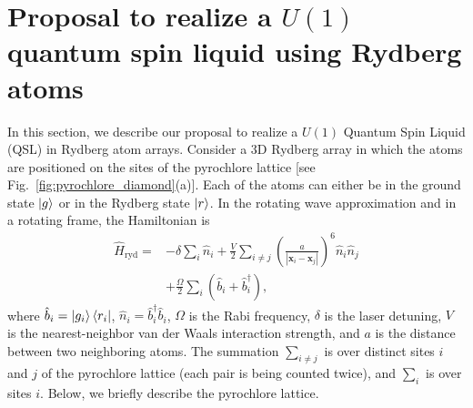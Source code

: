 \documentclass[twocolumn,superscriptaddress,amsmath,amssymb,aps,prx,nofootinbib]{revtex4-2}
\begin{document}
\section{Proposal to realize a $U(1)$ quantum spin liquid using Rydberg atoms}\label{sec:proposal}



In this section, we describe our proposal to realize a $U(1)$ Quantum Spin Liquid (QSL) in Rydberg atom arrays. 
Consider a 3D Rydberg array in which the atoms are positioned on the sites of the pyrochlore lattice [see Fig.~\ref{fig:pyrochlore_diamond}(a)]. Each of the atoms can either be  in the ground state $\ket{g}$ or in the  Rydberg state $\ket{r}$. In the rotating wave approximation and in a rotating frame, the Hamiltonian is
\begin{equation}
\begin{aligned}
  \hat{H}_{\text{ryd}} =& -\delta \sum_i \hat{n}_i + \frac{V}{2} \sum_{i \neq j} \left( \frac{a}{|\bm{x}_i -\bm{x}_j|} \right)^6 \hat{n}_i \hat{n}_j\\
  &+\frac{\Omega}{2} \sum_i (\hat{b}_i + \hat{b}_i^\dagger ),
  \end{aligned}
\end{equation}
where $\hat{b}_i = \ket{g_i}\bra{r_i}$, $\hat{n}_i = \hat{b}_i^\dagger \hat{b}_i$, $\Omega$ is the Rabi frequency, $\delta$ is the laser detuning, $V$ is the nearest-neighbor van der Waals interaction strength,  and $a$ is the distance between two neighboring atoms. The summation $\sum_{i \neq j}$ is over distinct sites $i$ and $j$ of the pyrochlore lattice (each pair is being counted twice), and  $\sum_i$ is over sites $i$. Below, we briefly describe the pyrochlore lattice.
\end{document}
